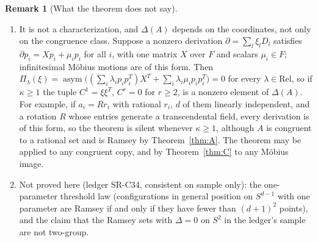 \documentclass[11pt]{amsart}
\theoremstyle{plain}
\theoremstyle{definition}
\newtheorem{remark}[theorem]{Remark}
\begin{document}
\begin{remark}[What the theorem does not say]\label{rem:silent}
\begin{enumerate}
\item[(a)] It is not a characterization, and $\Delta(A)$ depends on the coordinates, not only on the
congruence class. Suppose a nonzero derivation $\partial=\sum_l\xi_lD_l$ satisfies
$\partial p_i=Xp_i+\mu_ip_i$ for all $i$, with one matrix $X$ over $F$ and scalars $\mu_i\in F$; infinitesimal
M\"obius motions are of this form. Then
$\Pi_\lambda(\xi)=\operatorname{asym}\bigl((\sum_i\lambda_ip_ip_i^T)X^T+\sum_i\lambda_i\mu_ip_ip_i^T\bigr)=0$
for every $\lambda\in\mathrm{Rel}$, so if $\kappa\ge1$ the tuple $C^1=\xi\xi^T$, $C^r=0$ for $r\ge2$, is a
nonzero element of $\Delta(A)$. For example, if $a_i=Rr_i$ with rational $r_i$, $d$ of them linearly independent, and a
rotation $R$ whose entries generate a transcendental field, every derivation is of this form, so the
theorem is silent whenever $\kappa\ge1$, although $A$ is congruent to a rational set and is Ramsey by
Theorem~\ref{thm:A}. The theorem may be applied to any congruent copy, and by Theorem~\ref{thm:C} to any
M\"obius image.
\item[(b)] Not proved here (ledger SR-C34, consistent on sample only): the one-parameter threshold law
(configurations in general position on $S^{d-1}$ with one parameter are Ramsey if and only if they have
fewer than $(d+1)^2$ points), and the claim that the Ramsey sets with $\Delta=0$ on $S^2$ in the ledger's
sample are not two-group.
\end{enumerate}
\end{remark}
\end{document}
